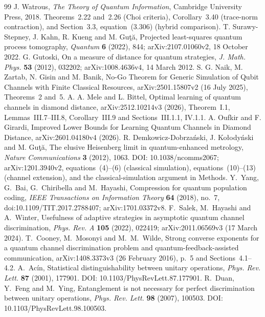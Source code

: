\begin{thebibliography}{99}
 J. Watrous, \emph{The Theory of Quantum Information},
Cambridge University Press, 2018. Theorems~2.22 and~2.26
(Choi criteria), Corollary~3.40 (trace-norm contraction),
and Section~3.3, equation~(3.306) (hybrid comparison).
 T. Surawy-Stepney, J. Kahn, R. Kueng and M. Gu\c{t}\u{a},
Projected least-squares quantum process tomography,
\emph{Quantum} \textbf{6} (2022), 844;
arXiv:2107.01060v2, 18 October 2022.
 G. Gutoski,
On a measure of distance for quantum strategies,
\emph{J. Math. Phys.} \textbf{53} (2012), 032202;
arXiv:1008.4636v4, 14 March 2012.
 S. G. Naik, M. Zartab, N. Gisin and M. Banik,
No-Go Theorem for Generic Simulation of Qubit Channels with Finite
Classical Resources, arXiv:2501.15807v2 (16 July 2025),
Theorems~2 and~5.
 A. A. Mele and L. Bittel,
Optimal learning of quantum channels in diamond distance,
arXiv:2512.10214v3 (2026), Theorem~I.1, Lemmas~III.7--III.8,
Corollary~III.9 and Sections~III.1.1, IV.1.1.
 A. Oufkir and F. Girardi,
Improved Lower Bounds for Learning Quantum Channels in Diamond
Distance, arXiv:2601.04180v4 (2026).
 R. Demkowicz-Dobrza\'nski, J. Ko\l ody\'nski
and M. Gu\c{t}\u{a}, The elusive Heisenberg limit in quantum-enhanced
metrology, \emph{Nature Communications} \textbf{3} (2012), 1063.
DOI: 10.1038/ncomms2067; arXiv:1201.3940v2, equations~(4)--(6)
(classical simulation), equations~(10)--(13) (channel extension),
and the classical-simulation argument in Methods.
 Y.~Yang, G.~Bai, G.~Chiribella and M.~Hayashi,
Compression for quantum population coding,
\emph{IEEE Transactions on Information Theory} \textbf{64} (2018), no.~7,
doi:10.1109/TIT.2017.2788407;
arXiv:1701.03372v8.
 F.~Salek, M.~Hayashi and A.~Winter,
Usefulness of adaptive strategies in asymptotic quantum channel
 discrimination, \emph{Phys. Rev. A} \textbf{105} (2022), 022419;
arXiv:2011.06569v3 (17 March 2024).
 T.~Cooney, M.~Mosonyi and M.~M.~Wilde,
Strong converse exponents for a quantum channel discrimination problem
and quantum-feedback-assisted communication,
arXiv:1408.3373v3 (26 February 2016), p.~5 and Sections~4.1--4.2.
 A.~Ac\'in,
Statistical distinguishability between unitary operations,
\emph{Phys. Rev. Lett.} \textbf{87} (2001), 177901.
DOI: 10.1103/PhysRevLett.87.177901.
 R.~Duan, Y.~Feng and M.~Ying,
Entanglement is not necessary for perfect discrimination between
unitary operations, \emph{Phys. Rev. Lett.} \textbf{98} (2007), 100503.
DOI: 10.1103/PhysRevLett.98.100503.


\end{thebibliography}
